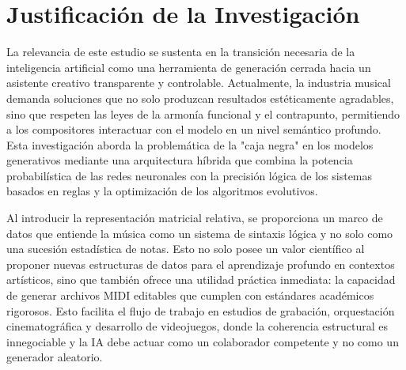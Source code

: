 \documentclass[12pt]{report}
\begin{document}
\section{Justificación de la Investigación}
La relevancia de este estudio se sustenta en la transición necesaria de la inteligencia artificial como una herramienta de generación cerrada hacia un asistente creativo transparente y controlable. Actualmente, la industria musical demanda soluciones que no solo produzcan resultados estéticamente agradables, sino que respeten las leyes de la armonía funcional y el contrapunto, permitiendo a los compositores interactuar con el modelo en un nivel semántico profundo. Esta investigación aborda la problemática de la "caja negra" en los modelos generativos mediante una arquitectura híbrida que combina la potencia probabilística de las redes neuronales con la precisión lógica de los sistemas basados en reglas y la optimización de los algoritmos evolutivos.

Al introducir la representación matricial relativa, se proporciona un marco de datos que entiende la música como un sistema de sintaxis lógica y no solo como una sucesión estadística de notas. Esto no solo posee un valor científico al proponer nuevas estructuras de datos para el aprendizaje profundo en contextos artísticos, sino que también ofrece una utilidad práctica inmediata: la capacidad de generar archivos MIDI editables que cumplen con estándares académicos rigorosos. Esto facilita el flujo de trabajo en estudios de grabación, orquestación cinematográfica y desarrollo de videojuegos, donde la coherencia estructural es innegociable y la IA debe actuar como un colaborador competente y no como un generador aleatorio.
\end{document}
